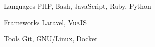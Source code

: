 
\begin{cvskills}
  \cvskill
    {Languages} %
    {PHP, Bash, JavaScript, Ruby, Python} %

  \cvskill
    {Frameworks} %
    {Laravel, VueJS} %

  \cvskill
    {Tools} %
    {Git, GNU/Linux, Docker} %
\end{cvskills}
